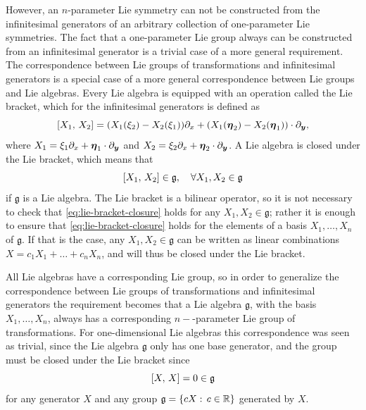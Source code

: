 However, an \(n\)-parameter Lie symmetry can not be constructed from the infinitesimal generators of an arbitrary collection of one-parameter Lie symmetries.
The fact that a one-parameter Lie group always can be constructed from an infinitesimal generator is a trivial case of a more general requirement.
The correspondence between Lie groups of transformations and infinitesimal generators is a special case of a more general correspondence between Lie groups and Lie algebras.
Every Lie algebra is equipped with an operation called the Lie bracket, which for the infinitesimal generators is defined as
\begin{equation*} %
  \comm{X_1}{X_2} = \left(X_1(\xi_2) - X_2(\xi_1)\right) \partial_x + \left(X_1(\vect{\eta}_2) - X_2(\vect{\eta}_1)\right) \cdot \partial_{\vect{y}},
\end{equation*}
where \(X_1 = \xi_1 \partial_x + \boldsymbol{\eta}_1 \cdot \partial_{\boldsymbol{y}}\) and \(X_2 = \xi_2 \partial_x + \boldsymbol{\eta}_2 \cdot \partial_{\boldsymbol{y}}\).
A Lie algebra is closed under the Lie bracket, which means that
\begin{equation} \label{eq:lie-bracket-closure}
  \comm{X_1}{X_2} \in \mathfrak{g}, \quad \forall X_1, X_2 \in \mathfrak{g}
\end{equation}
if \(\mathfrak{g}\) is a Lie algebra.
The Lie bracket is a bilinear operator, so it is not necessary to check that \cref{eq:lie-bracket-closure} holds for any \(X_1, X_2 \in \mathfrak{g}\); rather it is enough to ensure that \cref{eq:lie-bracket-closure} holds for the elements of a basis \(X_1, \dots, X_n\) of \(\mathfrak{g}\).
If that is the case, any \(X_1, X_2 \in \mathfrak{g}\) can be written as linear combinations \(X = c_1 X_1 + \dots + c_n X_n\), and will thus be closed under the Lie bracket.

All Lie algebras have a corresponding Lie group, so in order to generalize the correspondence between Lie groups of transformations and infinitesimal generators the requirement becomes that a Lie algebra \(\mathfrak{g}\), with the basis \(X_1, \dots, X_n\), always has a corresponding \(n-\)-parameter Lie group of transformations.
For one-dimensional Lie algebras this correspondence was seen as trivial, since the Lie algebra \(\mathfrak{g}\) only has one base generator, and the group must be closed under the Lie bracket since
\begin{equation*}
  \comm{X}{X} = 0 \in \mathfrak{g}
\end{equation*}
for any generator \(X\) and any group \(\mathfrak{g} = \left\{cX:\, c \in \reals\right\}\) generated by \(X\).

